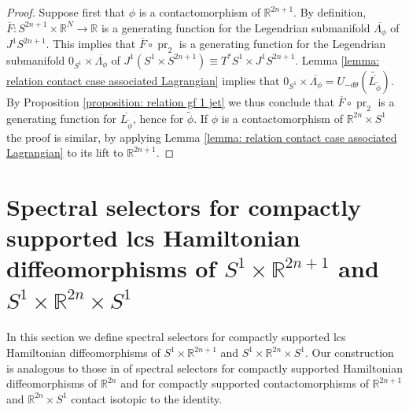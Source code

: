\documentclass{amsart}
\DeclareMathOperator{\pr}{pr}
\theoremstyle{remark}
\begin{document}
\begin{proof}
Suppose first that $\phi$ is a contactomorphism of $\mathbb{R}^{2n+1}$.
By definition,
$\overline{F}: S^{2n+1} \times \mathbb{R}^N \rightarrow \mathbb{R}$
is a generating function for the Legendrian submanifold
$\overline{\Lambda_{\phi}}$ of $J^1 S^{2n+1}$.
This implies that
$\overline{F} \circ \pr_2$
is a generating function for the Legendrian submanifold
$0_{S^1} \times \overline{\Lambda_{\phi}}$ of $J^1 (S^1 \times S^{2n+1})
\equiv T^{\ast}S^1 \times J^1 S^{2n+1}$.
Lemma \ref{lemma: relation contact case associated Lagrangian}
implies that $0_{S^1} \times \overline{\Lambda_{\phi}}
= U_{-d\theta} ( \widetilde{\overline{L_{\widetilde{\phi}}}})$.
By Proposition \ref{proposition: relation gf 1 jet}
we thus conclude that $\overline{F} \circ \pr_2$ is a generating function
for $\overline{L_{\widetilde{\phi}}}$,
hence for $\widetilde{\phi}$.
If $\phi$ is a contactomorphism of $\mathbb{R}^{2n} \times S^1$
the proof is similar,
by applying Lemma \ref{lemma: relation contact case associated Lagrangian}
to its lift to $\mathbb{R}^{2n+1}$.
\end{proof}



\section{Spectral selectors for compactly supported lcs
Hamiltonian diffeomorphisms of $S^1 \times \mathbb{R}^{2n+1}$
and $S^1 \times \mathbb{R}^{2n} \times S^1$}
\label{section: spectral invariants}

In this section we define spectral selectors
for compactly supported lcs
Hamiltonian diffeomorphisms of $S^1 \times \mathbb{R}^{2n+1}$
and $S^1 \times \mathbb{R}^{2n} \times S^1$.
Our construction is analogous to those
in \cite{Viterbo, Bhupal, San10, San11}
of spectral selectors for compactly supported
Hamiltonian diffeomorphisms of $\mathbb{R}^{2n}$
and for compactly supported contactomorphisms
of $\mathbb{R}^{2n+1}$ and $\mathbb{R}^{2n} \times S^1$
contact isotopic to the identity.
\end{document}
